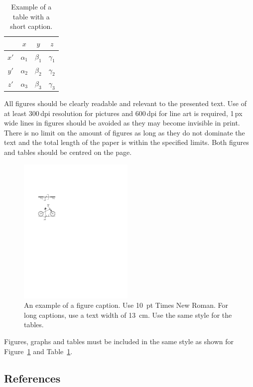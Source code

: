 \documentclass{bmd2016p}
\begin{document}
\begin{table}[h!]
\begin{center}
\caption{Example of a table with a short caption.} \label{tab:tab1}
\begin{tabular}{|c|ccc|}
\hline
    &  $x$  &  $y$  &  $z$ \\
\hline
$x'$  &  $\alpha_1$ & $\beta_1$ & $\gamma_1$ \\
$y'$  &  $\alpha_2$ & $\beta_2$ & $\gamma_2$ \\
$z'$  &  $\alpha_3$ & $\beta_3$ & $\gamma_3$ \\
\hline
\end{tabular}
\end{center}
\end{table}
All figures should be clearly readable and relevant to the presented text. Use 
of at least 300\,dpi resolution for pictures and 600\,dpi for line art is 
required, 1\,px wide lines in figures should be avoided as they may become 
invisible in print. There is no limit on the amount of figures as long as they 
do not dominate the text and the total length of the paper is within the 
specified limits. Both figures and tables should be centred on the page.

\begin{figure}[h!]
\begin{center}
  \includegraphics[width=55mm]{figure1}
  \caption{An example of a figure caption. Use 10~pt Times New Roman.
           For long captions, use a text width of 13~cm.
           Use the same style for the tables.} \label{fig:fig1}
\end{center}
\end{figure}
Figures, graphs and tables must be included in the same style as shown for 
Figure~\ref{fig:fig1} and Table~\ref{tab:tab1}.


\subsection{References}
\end{document}
